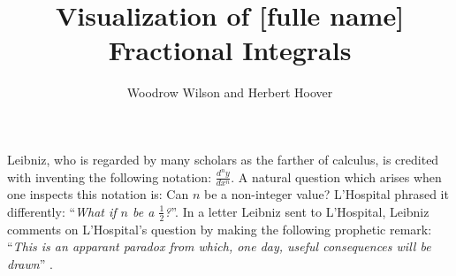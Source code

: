 \documentclass{article}
\theoremstyle{theorem}
\theoremstyle{definition}
\begin{document}
\title{Visualization of [fulle name] Fractional Integrals}
\author{Woodrow Wilson and Herbert Hoover} %

\maketitle



\noindent
Leibniz, who is regarded by many scholars as the farther of calculus, is credited with inventing the following notation: $\frac{d^n y}{d x^n}$. 
A natural question which arises when one inspects this notation is: Can $n$ be a non-integer value? L'Hospital phrased it differently: ``\emph{What if $n$ be a $\frac{1}{2}$?}''. 
In a letter Leibniz sent to L'Hospital, Leibniz comments on L'Hospital's question by making the following prophetic remark: ``\emph{This is an apparant paradox from which, one day, useful 
consequences will be drawn}'' \cite{ross77,machado14}.\\
\end{document}
